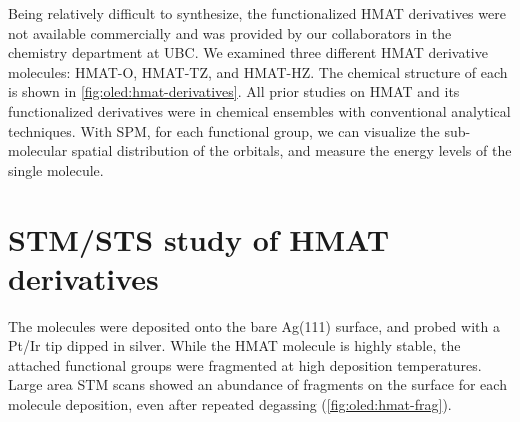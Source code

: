 \begin{figure} [h]
    \centering
    \caption{}
    \label{fig:oled:dft-hmat}
\end{figure}

Being relatively difficult to synthesize, the functionalized \ac{HMAT} derivatives were not available commercially and was provided by our collaborators in the chemistry department at \ac{UBC}. We examined three different \ac{HMAT} derivative molecules: \ac{HMAT-O}, \ac{HMAT-TZ}, and \ac{HMAT-HZ}. The chemical structure of each is shown in \autoref{fig:oled:hmat-derivatives}. All prior studies on \ac{HMAT} and its functionalized derivatives were in chemical ensembles with conventional analytical techniques. With \ac{SPM}, for each functional group, we can visualize the sub-molecular spatial distribution of the orbitals, and measure the energy levels of the single molecule. 



\begin{figure} [h]
    \centering
    \caption{}
    \label{fig:oled:hmat-derivatives}
\end{figure}




\section{{STM}/{STS} study of HMAT derivatives}

The molecules were deposited onto the bare Ag(111) surface, and probed with a Pt/Ir tip dipped in silver. While the \ac{HMAT} molecule is highly stable, the attached functional groups were fragmented at high deposition temperatures. Large area \ac{STM} scans showed an abundance of fragments on the surface for each molecule deposition, even after repeated degassing (\autoref{fig:oled:hmat-frag}). 

